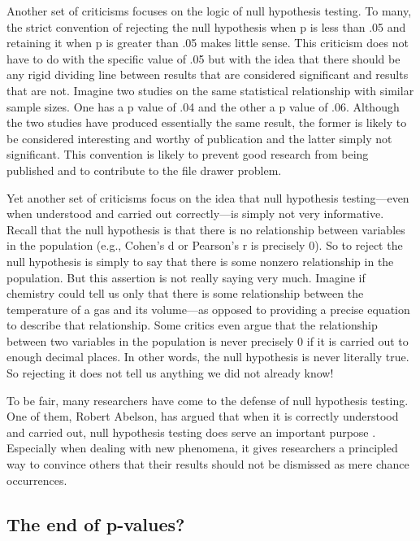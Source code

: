 Another set of criticisms focuses on the logic of null hypothesis testing. To many, the strict convention of rejecting the null hypothesis when p is less than .05 and retaining it when p is greater than .05 makes little sense. This criticism does not have to do with the specific value of .05 but with the idea that there should be any rigid dividing line between results that are considered significant and results that are not. Imagine two studies on the same statistical relationship with similar sample sizes. One has a p value of .04 and the other a p value of .06. Although the two studies have produced essentially the same result, the former is likely to be considered interesting and worthy of publication and the latter simply not significant. This convention is likely to prevent good research from being published and to contribute to the file drawer problem.


Yet another set of criticisms focus on the idea that null hypothesis testing---even when understood and carried out correctly---is simply not very informative. Recall that the null hypothesis is that there is no relationship between variables in the population (e.g., Cohen's d or Pearson's r is precisely 0). So to reject the null hypothesis is simply to say that there is some nonzero relationship in the population. But this assertion is not really saying very much. Imagine if chemistry could tell us only that there is some relationship between the temperature of a gas and its volume---as opposed to providing a precise equation to describe that relationship. Some critics even argue that the relationship between two variables in the population is never precisely 0 if it is carried out to enough decimal places. In other words, the null hypothesis is never literally true. So rejecting it does not tell us anything we did not already know!


To be fair, many researchers have come to the defense of null hypothesis testing. One of them, Robert Abelson, has argued that when it is correctly understood and carried out, null hypothesis testing does serve an important purpose \citep{abelson_statistics_2012}. Especially when dealing with new phenomena, it gives researchers a principled way to convince others that their results should not be dismissed as mere chance occurrences.


\subsection{The end of p-values?}



